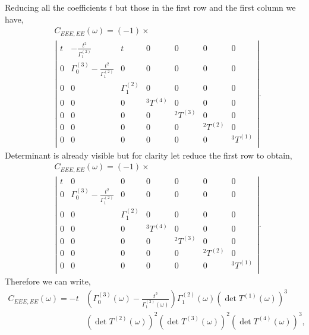 \documentclass{article}
\begin{document}
Reducing all the coefficients $t$ but those in the first row and the first column we have,
\begin{equation}
\begin{split}
    &C_{EEE,EE}(\omega) = (-1) \times\\ 
    &\left\vert
    \begin{array}{c|c|c|c|c|c|c}
        t & -\frac{t^2}{\Gamma_1^{(2)}} & t & 0 & 0 & 0 & 0 \\
        \hline
        0 & \Gamma_0^{(3)} - \frac{t^2}{\Gamma_1^{(2)}} & 0 & 0 & 0 & 0 & 0 \\
        \hline
        0 & 0 & \Gamma_1^{(2)} & 0 & 0 & 0 & 0 \\
        \hline
        0 & 0 & 0 & ^3T^{(4)} & 0 & 0 & 0 \\
        \hline
        0 & 0 & 0 & 0 & ^2T^{(3)} & 0 & 0 \\
        \hline
        0 & 0 & 0 & 0 & 0 & ^2T^{(2)} & 0 \\
        \hline
        0 & 0 & 0 & 0 & 0 & 0 & ^3T^{(1)} \\
    \end{array}
    \right\vert.
\end{split}
\end{equation}
Determinant is already visible but for clarity let reduce the first row to obtain,
\begin{equation}
\begin{split}
    &C_{EEE,EE}(\omega) = (-1) \times\\ 
    &\left\vert
    \begin{array}{c|c|c|c|c|c|c}
        t & 0 & 0 & 0 & 0 & 0 & 0 \\
        \hline
        0 & \Gamma_0^{(3)} - \frac{t^2}{\Gamma_1^{(2)}} & 0 & 0 & 0 & 0 & 0 \\
        \hline
        0 & 0 & \Gamma_1^{(2)} & 0 & 0 & 0 & 0 \\
        \hline
        0 & 0 & 0 & ^3T^{(4)} & 0 & 0 & 0 \\
        \hline
        0 & 0 & 0 & 0 & ^2T^{(3)} & 0 & 0 \\
        \hline
        0 & 0 & 0 & 0 & 0 & ^2T^{(2)} & 0 \\
        \hline
        0 & 0 & 0 & 0 & 0 & 0 & ^3T^{(1)} \\
    \end{array}
    \right\vert.
\end{split}
\end{equation}
Therefore we can write,
\begin{equation}
\begin{split}
    C_{EEE,EE}(\omega) =  -t &\left(
        \Gamma_0^{(3)}(\omega) - \frac{t^2}{\Gamma_1^{(2)}(\omega)}
    \right)
    \Gamma_1^{(2)}(\omega)
    \left(
        \det T^{(1)}(\omega)
    \right)^3 \\ &
    \left(
        \det T^{(2)}(\omega)
    \right)^2
    \left(
        \det T^{(3)}(\omega)
    \right)^2
    \left(
        \det T^{(4)}(\omega)
    \right)^3,
\end{split}
\end{equation}
\end{document}
